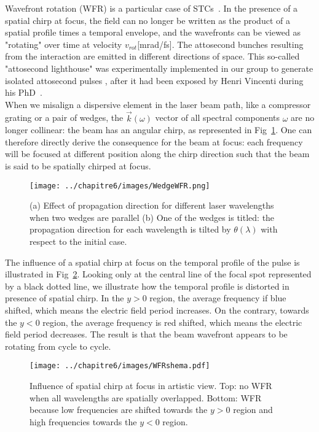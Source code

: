 Wavefront rotation (WFR) is a particular case of STCs~\cite{akturk2007first,akturk2006general}. In the presence of a spatial chirp at focus, the field can no longer be written as the product of a spatial profile times a temporal envelope, and the wavefronts can be viewed as "rotating" over time at velocity $v_{rot}$[mrad/fs]. The attosecond bunches resulting from the interaction are emitted in different directions of space. This so-called "attosecond lighthouse" was experimentally implemented in our group to generate isolated attosecond pulses \cite{theseAnto,Wheeler2012}, after it had been exposed by Henri Vincenti during his PhD~\cite{TheseHenri,vincenti2012attosecond}.\\

\noindent  When we misalign a dispersive element in the laser beam path, like a compressor grating or a pair of wedges, the $\vec{k}(\omega)$ vector of all spectral components $\omega$ are no longer collinear: the beam has an angular chirp, as represented in Fig~\ref{fig:WedgeWFR}. One can therefore directly derive the consequence for the beam at focus: each frequency will be focused at different position along the chirp direction such that the beam is said to be spatially chirped at focus.

\begin{figure}[H]
\centering
\texttt{[image: ../chapitre6/images/WedgeWFR.png]}\\
\caption{\label{fig:WedgeWFR} (a) Effect of propagation direction for different laser wavelengths when two wedges are parallel (b) One of the wedges is titled: the propagation direction for each wavelength is tilted by $\theta (\lambda) $ with respect to the initial case.}
\end{figure}

\noindent The influence of a spatial chirp at focus on the temporal profile of the pulse is illustrated in Fig~\ref{fig:WFRshema}. Looking only at the central line of the focal spot represented by a black dotted line, we illustrate how the temporal profile is distorted in presence of spatial chirp. In the $y>0$ region, the average frequency if blue shifted, which means the electric field period increases. On the contrary, towards the $y<0$ region, the average frequency is red shifted, which means the electric field period decreases. The result is that the beam wavefront appears to be rotating from cycle to cycle.

\begin{figure}[H]
\centering
\texttt{[image: ../chapitre6/images/WFRshema.pdf]}\\
\caption{\label{fig:WFRshema} Influence of spatial chirp at focus in artistic view. Top: no WFR when all wavelengths are spatially overlapped. Bottom: WFR because low frequencies are shifted towards the $y>0$ region and high frequencies towards the $y<0$ region.}
\end{figure}


